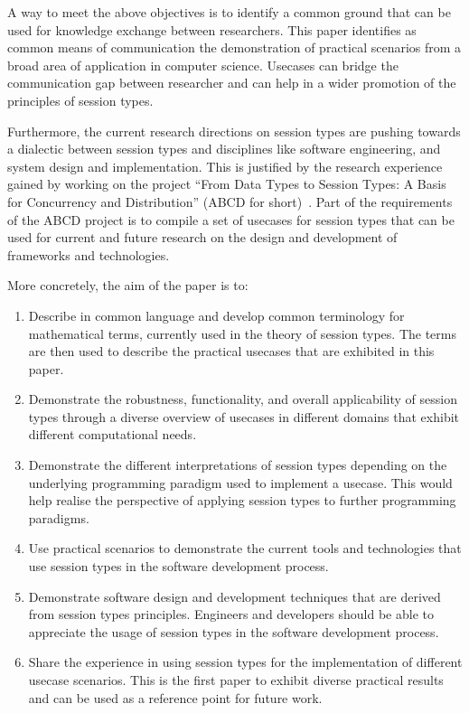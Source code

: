 A way to meet the above objectives is to identify a common
ground that can be used for knowledge exchange between researchers.
This paper identifies as common means of communication the demonstration
of practical scenarios from a broad area of application in computer science.
Usecases can bridge the communication gap between researcher and can help
in a wider promotion of the principles of session types.

Furthermore, the current research directions on session types are
pushing towards a dialectic between session types and disciplines
like software engineering, and system design and implementation.
This is justified by the research experience gained by working
on the project
``From Data Types to Session Types: A Basis for Concurrency and Distribution''
(ABCD for short)~\cite{ABCD}.
Part of the requirements of the ABCD project is to compile a set of usecases
for session types that can be used for current and future research on
the design and development of frameworks and technologies.

More concretely, the aim of the paper is to:
%
\begin{enumerate}
	\item	Describe in common language and develop common terminology
			for mathematical terms, currently used in the theory of
			session types.
			The terms are then used to describe the practical usecases
			that are exhibited in this paper.

	\item	Demonstrate the robustness, functionality, and overall applicability
			of session types through a diverse overview of usecases in
			different domains that exhibit different computational needs.

	\item	Demonstrate the different interpretations of
			session types depending on the underlying programming paradigm
			used to implement a usecase.
			This would help realise the perspective of applying session types to
			further programming paradigms.


	\item	Use practical scenarios to demonstrate the current tools and
			technologies that use session types in the software development
			process.

	\item	Demonstrate software design and development techniques that
			are derived from session types principles. Engineers and
			developers should be able to appreciate the usage of session types
			in the software development process.
		
	\item	Share the experience in using session types for the
			implementation of different usecase scenarios. This
			is the first paper to exhibit diverse practical results
			and can be used as a reference point for future work.
\end{enumerate}

